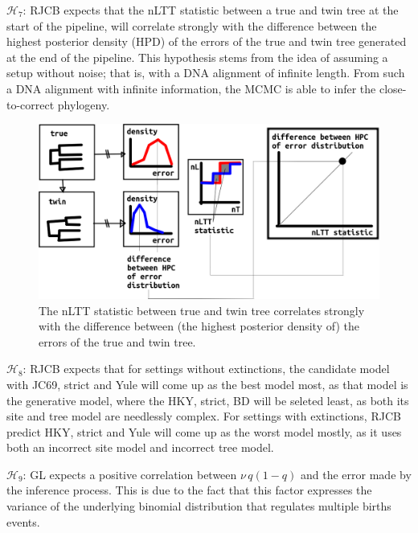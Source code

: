 $\mathcal{H}_7$: RJCB expects that the nLTT statistic between a true and twin
tree at the start of the pipeline,
will correlate strongly with the difference
between the highest posterior density (HPD) of the 
errors of the true and twin tree 
generated at the end of the pipeline. 
This hypothesis
stems from the idea of assuming a setup without noise; that is, with
a DNA alignment of infinite length. From such a DNA alignment 
with infinite information, the MCMC
is able to infer the close-to-correct phylogeny.

\begin{figure}[!htbp]
  \includegraphics[width=\textwidth]{20191126_nltt_as_proxy.png}
  \caption{
    The nLTT statistic between true and twin tree correlates strongly
    with the difference between (the highest posterior density
    of) the errors of the true and twin tree.
  }
  \label{fig:nltt_as_proxy}
\end{figure}

$\mathcal{H}_8$: RJCB expects that for settings without extinctions,
the candidate model with JC69, strict and Yule will come up as the best
model most, as that model is the generative model, where the HKY, strict, BD
will be seleted least, as both its site and tree model are needlessly complex.
For settings with extinctions, RJCB predict HKY, strict and Yule will come up 
as the worst model mostly, as it uses both an incorrect site model and incorrect
tree model. 

$\mathcal{H}_9$: GL expects a positive correlation between $\nu \, q(1-q)$ and the error made by the inference process. This is due to the fact that this factor expresses the variance of the underlying binomial distribution that regulates multiple births events.